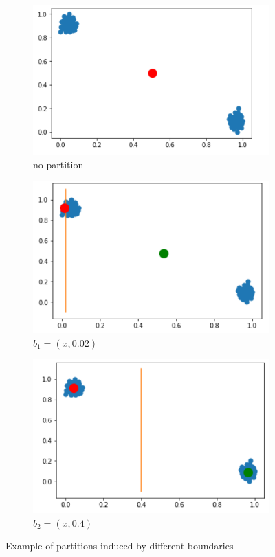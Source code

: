 \documentclass[conference]{IEEEtran}
\begin{document}
\begin{figure}[H]
		\centering
		\begin{subfigure}[b]{0.3\linewidth}
			\includegraphics[width=\linewidth]{img01}
			\caption{no partition}
		\end{subfigure}
		\begin{subfigure}[b]{0.3\linewidth}
			\includegraphics[width=\linewidth]{img02}
			\caption{$b_1=(x,0.02)$}
		\end{subfigure}
		\begin{subfigure}[b]{0.3\linewidth}
			\includegraphics[width=\linewidth]{img03}
			\caption{$b_2=(x,0.4)$}
		\end{subfigure}
		\caption{Example of partitions induced by different boundaries}
		\label{fig1}
\end{figure}
\end{document}
